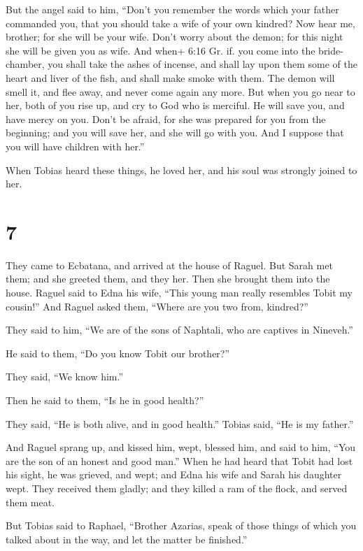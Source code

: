  But the angel said to him, ``Don't you remember the words
which your father commanded you, that you should take a wife of your own
kindred? Now hear me, brother; for she will be your wife. Don't worry
about the demon; for this night she will be given you as wife.
 And when+ 6:16 Gr. if. you come into the bride-chamber,
you shall take the ashes of incense, and shall lay upon them some of the
heart and liver of the fish, and shall make smoke with them.
 The demon will smell it, and flee away, and never come
again any more. But when you go near to her, both of you rise up, and
cry to God who is merciful. He will save you, and have mercy on you.
Don't be afraid, for she was prepared for you from the beginning; and
you will save her, and she will go with you. And I suppose that you will
have children with her.''

When Tobias heard these things, he loved her, and his soul was strongly
joined to her.

\hypertarget{section-6}{%
\section{7}\label{section-6}}

 They came to Ecbatana, and arrived at the house of Raguel.
But Sarah met them; and she greeted them, and they her. Then she brought
them into the house.  Raguel said to Edna his wife, ``This
young man really resembles Tobit my cousin!''  And Raguel
asked them, ``Where are you two from, kindred?''

They said to him, ``We are of the sons of Naphtali, who are captives in
Nineveh.''

 He said to them, ``Do you know Tobit our brother?''

They said, ``We know him.''

Then he said to them, ``Is he in good health?''

 They said, ``He is both alive, and in good health.'' Tobias
said, ``He is my father.''

 And Raguel sprang up, and kissed him, wept, 
blessed him, and said to him, ``You are the son of an honest and good
man.'' When he had heard that Tobit had lost his sight, he was grieved,
and wept;  and Edna his wife and Sarah his daughter wept.
They received them gladly; and they killed a ram of the flock, and
served them meat.

But Tobias said to Raphael, ``Brother Azarias, speak of those things of
which you talked about in the way, and let the matter be finished.''

